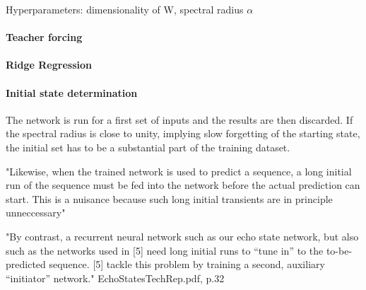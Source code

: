 Hyperparameters: dimensionality of W, spectral radius $\alpha$
\paragraph*{Teacher forcing}

\paragraph*{Ridge Regression}

\paragraph*{Initial state determination}
The network is run for a first set of inputs and the results are then discarded. If the spectral radius is close to unity, implying slow forgetting of the starting state, the initial set has to be a substantial part of the training dataset.

"Likewise, when the trained network is used to predict a sequence, a long initial run of the sequence must be fed into the network before the actual prediction can start. This is a nuisance because such long initial transients are in principle unneccessary"

"By contrast, a recurrent neural network such as our echo state network, but also such as the networks used in [5] need long initial runs to “tune in” to the to-be-predicted sequence. [5] tackle this problem by training a second, auxiliary “initiator” network."
EchoStatesTechRep.pdf, p.32

